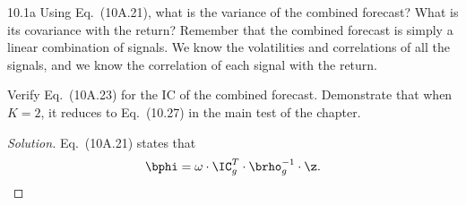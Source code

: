 \begin{problem}{10.1a}
Using Eq.\ (10A.21), what is the variance of the combined forecast? What is its covariance with the return? Remember that the combined forecast is simply a linear combination of signals. We know the volatilities and correlations of all the signals, and we know the correlation of each signal with the return.

Verify Eq.\ (10A.23) for the IC of the combined forecast. Demonstrate that when $K = 2$, it reduces to Eq.\ (10.27) in the main test of the chapter. 
\end{problem}

\begin{proof}[Solution]
Eq.\ (10A.21) states that \[\bphi = \omega \cdot \IC_{g}^{T} \cdot \brho_{g}^{-1} \cdot \z.\]
\end{proof}

